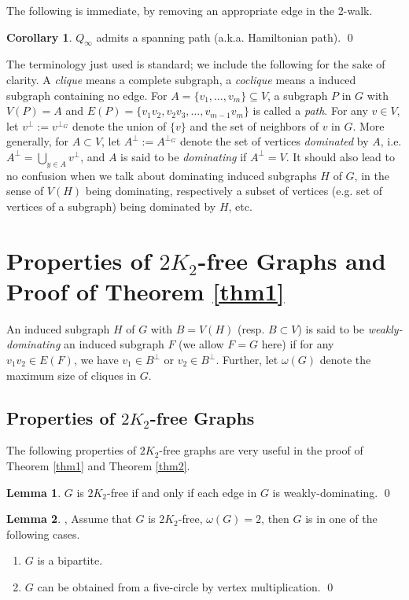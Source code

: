 \documentclass{amsart}
\theoremstyle{definition}
\newtheorem{corollary}{Corollary}
\newtheorem{lemma}{Lemma}
\begin{document}
The following is immediate, by removing an appropriate edge in the 2-walk.
\begin{corollary}\label{cor:2w}
$Q_{\infty}$ admits a spanning path (a.k.a. Hamiltonian path). \qed
\end{corollary}

The terminology just used is standard; we include the following for the sake of
clarity.  A {\em clique} means a complete subgraph, a {\em coclique} means a
induced subgraph containing no edge. For $A=\{v_1,\ldots,v_m\}\subseteq V$, a
subgraph $P$ in $G$ with $V(P)=A$ and
$E(P)=\{v_1v_2,v_2v_3,\ldots,v_{m-1}v_m\}$ is called a {\em path}.  For any
$v\in V$, let $v^\perp:=v^{\perp_G}$ denote the union of $\{v\}$ and the set of
neighbors of $v$ in $G$.  More generally, for $A\subset V$, let
$A^\perp:=A^{\perp_G}$ denote the set of vertices {\em dominated} by $A$, i.e.
$A^\perp=\bigcup\limits_{y\in A}v^\perp$, and $A$ is said to be {\em
dominating} if $A^\perp=V$.  It should also lead to no confusion when we talk
about  dominating induced subgraphs $H$ of $G$, in the sense of $V(H)$ being
dominating, respectively a subset of vertices (e.g. set of vertices of a
subgraph) being dominated by $H$, etc.

\section{Properties of $2K_2$-free Graphs and Proof of Theorem \ref{thm1}}
An induced subgraph $H$ of $G$ with $B=V(H)$ (resp. $B\subset V$) is said to be {\em weakly-dominating}
an induced subgraph $F$ (we allow $F=G$ here) 
if for any $v_1v_2\in E(F)$, we have $v_1\in B^\perp$ or $v_2\in B^\perp$.
Further, let $\omega(G)$ denote the maximum size of cliques in $G$. 

\subsection{Properties of $2K_2$-free Graphs}
The following properties of $2K_2$-free graphs are very useful in the proof of Theorem \ref{thm1} and Theorem \ref{thm2}.

\begin{lemma}\label{trivial}
$G$ is $2K_2$-free if and only if each edge in $G$ is weakly-dominating. \qed
\end{lemma}

\begin{lemma}\label{lm1}{\cite[Theorem 2]{chung1990maximum}, \cite[Lemma 2]{broersma2014toughness}}
Assume that $G$ is $2K_2$-free, $\omega(G)=2$, then $G$ is in one of the following cases.
\begin{enumerate}
\item $G$ is a bipartite.
\item $G$ can be obtained from a five-circle by vertex multiplication. \qed
\end{enumerate}
\end{lemma}
\end{document}
